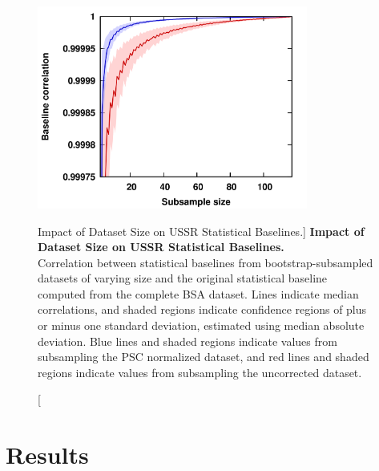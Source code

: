 \begin{figure}
\includegraphics[width=3.5in]{figs/ussr/04-blcorr.png}
\caption
      [Impact of Dataset Size on USSR Statistical Baselines.]{
  {\bf Impact of Dataset Size on USSR Statistical Baselines.}
  \\
  Correlation between statistical baselines from bootstrap-subsampled datasets
  of varying size and the original statistical baseline computed from the
  complete BSA dataset. Lines indicate median correlations, and shaded regions
  indicate confidence regions of plus or minus one standard deviation,
  estimated using median absolute deviation. Blue lines and shaded regions
  indicate values from subsampling the PSC normalized dataset, and red lines
  and shaded regions indicate values from subsampling the uncorrected dataset.
}
\end{figure}

\section{Results}

